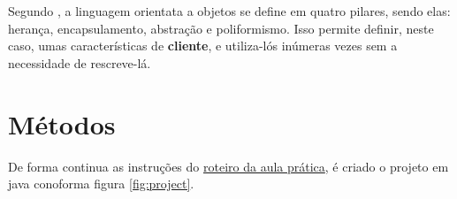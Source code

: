 \par Segundo , a linguagem orientata a objetos se define em quatro pilares, sendo elas: herança, encapsulamento, abstração e poliformismo. Isso permite definir, neste caso, umas características de \textbf{cliente}, e utiliza-lós inúmeras vezes sem a necessidade de rescreve-lá.

\section{Métodos}
\par De forma continua as instruções do \href{https://github.com/OgliariNatan/gerenciaBanco/blob/main/Aula%20pr%C3%A1tica.pdf}{roteiro da aula prática}, é criado o projeto em java conoforma figura \ref{fig:project}.

\begin{figure}[h!]
  \centering

\end{figure}
